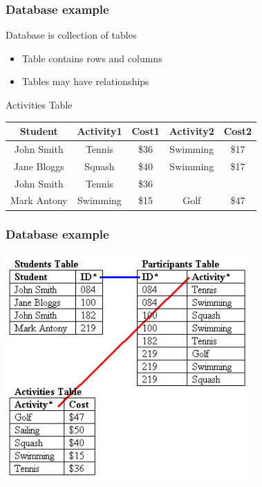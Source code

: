 \begin{frame}[fragile]
        \frametitle{Database example}
Database is collection of tables
\begin{itemize}
    \item Table contains rows and columns
    \item Tables may have relationships
\end{itemize}

Activities Table
\begin{tabular}{| c | c | c | c | c |}
   \hline
   Student     & Activity1 & Cost1 & Activity2 & Cost2 \\ 
   \hline 
   John Smith  & Tennis    & \$36  & Swimming  & \$17  \\
   Jane Bloggs & Squash    & \$40  & Swimming  & \$17  \\
   John Smith  & Tennis    & \$36  &           &       \\
   Mark Antony & Swimming  & \$15  & Golf      & \$47  \\ 
   \hline
\end{tabular}

\end{frame}

\begin{frame}[fragile]
        \frametitle{Database example}
        \center\includegraphics[width=0.7\textwidth]{../../slides/web/media/db_table.png}
\end{frame}
